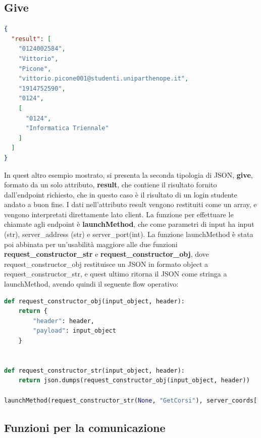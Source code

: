 \documentclass{article}
\begin{document}
\subsection{Give}
\begin{lstlisting}[language=json,firstnumber=1]
{
  "result": [
    "0124002584",
    "Vittorio",
    "Picone",
    "vittorio.picone001@studenti.uniparthenope.it",
    "1914752590",
    "0124",
    [
      "0124",
      "Informatica Triennale"
    ]
  ]
}
\end{lstlisting}
In quest altro esempio mostrato, si presenta la seconda tipologia di JSON, \textbf{give}, formato da un solo attributo, \textbf{result}, che contiene il risultato fornito dall'endpoint richiesto, che in questo caso è il risultato di un login studente andato a buon fine. I dati nell'attributo result vengono restituiti come un array, e vengono interpretati direttamente lato client. La funzione per effettuare le chiamate agli endpoint è \textbf{launchMethod}, che come parametri di input ha input (str), server\_address (str) e server\_port(int). La funzione launchMethod è stata poi abbinata per un'usabilità maggiore alle due funzioni \textbf{request\_constructor\_str} e \textbf{request\_constructor\_obj}, dove request\_constructor\_obj restituisce un JSON in formato object a request\_constructor\_str, e quest ultimo ritorna il JSON come stringa a launchMethod, avendo quindi il seguente flow operativo:
\begin{lstlisting}[language=python,firstnumber=1]
def request_constructor_obj(input_object, header):
    return {
        "header": header,
        "payload": input_object
    }


def request_constructor_str(input_object, header):
    return json.dumps(request_constructor_obj(input_object, header))

launchMethod(request_constructor_str(None, "GetCorsi"), server_coords['address'], server_coords['port']))
\end{lstlisting}

\subsection{Funzioni per la comunicazione}
\end{document}

